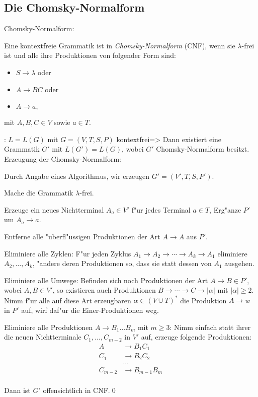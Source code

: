\subsection{Die Chomsky-Normalform}
\label{sub:chomsky-nf}
 Chomsky-Normalform:{
  Eine kontextfreie Grammatik ist in \emph{Chomsky-Normalform} (CNF),
  wenn sie $\lambda$-frei ist und alle ihre Produktionen von folgender
  Form sind:
  \begin{itemize}
    \item $S \to \lambda$ oder
    \item $A \to BC$ oder
    \item $A \to a,$
    \end{itemize}
  mit $A, B, C \in V$ sowie $a \in T$.
  }
\theorem:
  $L=L(G)$ mit $G=(V,T,S,P)$ kontextfrei=>{
  \label{the:chomsky-nf}
  Dann existiert eine Grammatik $G'$ mit $L(G')=L(G)$, wobei $G'$ 
  Chomsky-Normalform besitzt.
  }
\proof Erzeugung der Chomsky-Normalform:{
  Durch Angabe eines Algorithmus, wir erzeugen $G'=(V',T,S,P')$.
  \begin{proc}
    \item Mache die Grammatik $\lambda$-frei.
    \item Erzeuge ein neues Nichtterminal $A_a\in V'$ 
      f"ur jedes Terminal $a\in T$, Erg"anze $P'$ um $A_a\to a$.
    \item Entferne alle "uberfl"ussigen Produktionen der Art
      $A\to A$ aus $P'$.
    \item Eliminiere alle Zyklen:
      F"ur jeden Zyklus $A_1\to A_2\to \cdots\to A_k\to A_1$ eliminiere
      $A_2,\ldots,A_k$, "andere deren Produktionen so, dass sie statt dessen
      von $A_1$ ausgehen.
    \item Eliminiere alle Umwege:
      Befinden sich noch Produktionen der Art $A\to B\in P'$, wobei $A,B\in V'$,
      so existieren auch Produktionen $B\to\cdots\to C\to |\alpha|$ mit $|\alpha|\ge 2$. 
      Nimm f"ur alle auf diese Art erzeugbaren $\alpha\in (V\cup T)^*$ die 
      Produktion $A\to w$ in $P'$ auf, wirf daf"ur die Einer-Produktionen
      weg.
    \item Eliminiere alle Produktionen $A\to B_1\ldots B_m$ mit $m\ge 3$:
      Nimm einfach statt ihrer die neuen Nichtterminale $C_1,\ldots,C_{m-2}$
      in $V'$ auf, erzeuge folgende Produktionen:
      \begin{align*}
        A&\to B_1C_1 \\
        C_1&\to B_2C_2\\
        &\dots\\
        C_{m-2}&\to B_{m-1}B_m \\
        \end{align*}
    \end{proc}
  Dann ist $G'$ offensichtlich in CNF.\qed
  }
